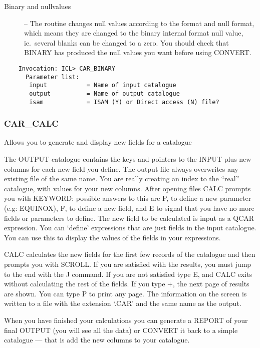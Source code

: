 \begin{description}
\item [Binary and nullvalues] --
The routine changes null values according to the format and null format,
which means they are changed to the binary internal format null value,
ie.\ several blanks can be changed to a zero.
You should check that BINARY has produced the null values you want before using
CONVERT.
\end{description}

\begin{verbatim}
    Invocation: ICL> CAR_BINARY
      Parameter list:
       input           = Name of input catalogue
       output          = Name of output catalogue
       isam            = ISAM (Y) or Direct access (N) file?
\end{verbatim}

\subsubsection{CAR\_CALC}

Allows you to generate and display new fields for a catalogue

The OUTPUT catalogue contains the keys and pointers to the INPUT
plus new columns for each new field you define.
The output file always overwrites any existing file of the same name.
You are really creating an index to the ``real'' catalogue, with values for
your new columns.
After opening files CALC prompts you with KEYWORD:
possible answers to this are P, to define a new parameter (e.g: EQUINOX),
F, to define a new field, and E to signal that you have no more fields
or parameters to define.
The new field to be calculated is input as a QCAR expression.
You can `define' expressions that are just fields in the input catalogue.
You can use this to display the values of the fields in your expressions.

CALC calculates the new fields for the first few records
of the catalogue and then prompts you with SCROLL.
If you are satisfied with the results, you must jump to the end with the J
command.
If you are not satisfied type E, and CALC exits without calculating the
rest of the fields.
If you type +, the next page of results are shown.
You can type P to print any page.
The information on the screen is written to a file with the extension `.CAR'
and the same name as the output.

When you have finished your calculations you can generate a REPORT of
your final OUTPUT (you will see all the data) or CONVERT it back to a
simple catalogue --- that is add the new columns to your catalogue.

